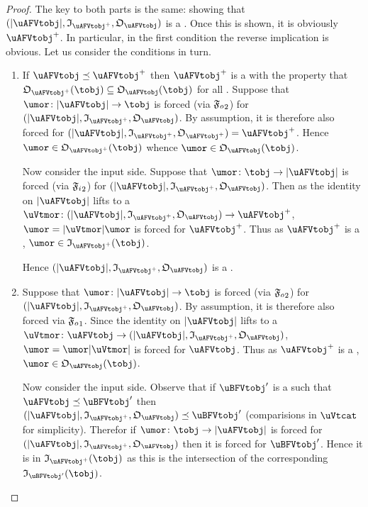 \documentclass[%
12pt,%
arxiv,%
defaults
]{myclass}
\begin{document}
\begin{proof}
The key to both parts is the same: showing that \((\forfunc[\uAFVtobj], \itest_{\mMo{\uAFVtobj}}, \otest_{\uAFVtobj})\) is a \uBFVtobjalt.
Once this is shown, it is obviously \(\mMo{\uAFVtobj}\).
In particular, in the first condition the reverse implication is obvious.
Let us consider the conditions in turn.

\begin{enumerate}
\item If \(\uAFVtobj \preceq \mMo{\uAFVtobj}\) then \(\mMo{\uAFVtobj}\) is a \uBFVtobjalt with the property that \(\otest_{\mMo{\uAFVtobj}}(\tobj) \subseteq \otest_{\uAFVtobj}(\tobj)\) for all \tobjs[\tobj].
Suppose that \(\umor \colon \forfunc[\uAFVtobj] \to \tobj\) is forced (via \(\mBo{\oforce}\)) for \((\forfunc[\uAFVtobj], \itest_{\mMo{\uAFVtobj}}, \otest_{\uAFVtobj})\).
By assumption, it is therefore also forced for \((\forfunc[\uAFVtobj], \itest_{\mMo{\uAFVtobj}}, \otest_{\mMo{\uAFVtobj}}) = \mMo{\uAFVtobj}\).
Hence \(\umor \in \otest_{\mMo{\uAFVtobj}}(\tobj)\) whence \(\umor \in \otest_{\uAFVtobj}(\tobj)\).

Now consider the input side.
Suppose that \(\umor \colon \tobj \to \forfunc[\uAFVtobj]\) is forced (via \(\mBo{\iforce}\)) for \((\forfunc[\uAFVtobj], \itest_{\mMo{\uAFVtobj}}, \otest_{\uAFVtobj})\).
Then as the identity on \(\forfunc[\uAFVtobj]\) lifts to a \uVtmor \(\uVtmor \colon (\forfunc[\uAFVtobj], \itest_{\mMo{\uAFVtobj}}, \otest_{\uAFVtobj}) \to \mMo{\uAFVtobj}\), \(\umor = \forfunc[\uVtmor]\umor\) is forced for \(\mMo{\uAFVtobj}\).
Thus as \(\mMo{\uAFVtobj}\) is a \uBFVtobjalt, \(\umor \in \itest_{\mMo{\uAFVtobj}}(\tobj)\).

Hence \((\forfunc[\uAFVtobj], \itest_{\mMo{\uAFVtobj}}, \otest_{\uAFVtobj})\) is a \uBFVtobjalt.

\item Suppose that  \(\umor \colon \forfunc[\uAFVtobj] \to \tobj\) is forced (via \(\mBo{\oforce}\)) for \((\forfunc[\uAFVtobj], \itest_{\mMo{\uAFVtobj}}, \otest_{\uAFVtobj})\).
By assumption, it is therefore also forced via \(\mAo{\oforce}\).
Since the identity on \(\forfunc[\uAFVtobj]\) lifts to a \uVtmor \(\uVtmor \colon \uAFVtobj \to (\forfunc[\uAFVtobj], \itest_{\mMo{\uAFVtobj}}, \otest_{\uAFVtobj})\), \(\umor = \umor \forfunc[\uVtmor]\) is forced for \(\uAFVtobj\).
Thus as \(\mMo{\uAFVtobj}\) is a \uAFVtobjalt, \(\umor \in \otest_{\uAFVtobj}(\tobj)\).

Now consider the input side.
Observe that if \(\uBFVtobj'\) is a \uBFVtobjalt such that \(\uAFVtobj \preceq \uBFVtobj'\) then \((\forfunc[\uAFVtobj], \itest_{\mMo{\uAFVtobj}}, \otest_{\uAFVtobj}) \preceq \uBFVtobj'\) (comparisions in \(\uVtcat\) for simplicity).
Therefor if \(\umor \colon \tobj \to \forfunc[\uAFVtobj]\) is forced for \((\forfunc[\uAFVtobj], \itest_{\mMo{\uAFVtobj}}, \otest_{\uAFVtobj})\) then it is forced for \(\uBFVtobj'\).
Hence it is in \(\itest_{\mMo{\uAFVtobj}}(\tobj)\) as this is the intersection of the corresponding \(\itest_{\uBFVtobj'}(\tobj)\).


\end{enumerate}
\end{proof}
\end{document}
